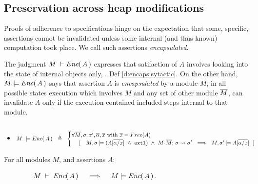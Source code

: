 \subsection{Preservation across heap modifications}

 
Proofs of adherence to {\SpecLang specifications  hinge on the expectation that some,  specific, assertions cannot be invalidated unless some 
} internal (and thus known) computation took place. 
{We call such assertions   \emph{encapsulated}.}
 

The judgment $M\ \vdash {\ensuremath Enc(\, A\, )}$  expresses that satifaction of $A$ involves looking into the state of  
internal objects only,  \cf. Def \ref{d:encaps:sytactic}.
{On the other hand, $M  \models {\ensuremath Enc(\, A\, )}$ says that assertion $A$  is  \emph{encapsulated} by a module $M$, \ie in all possible states %
execution which involves $M$ and any set of other module $\overline{M}$, can invalidate   $A$ only if the execution contained included steps internal to that module}.
 

\begin{definition} $~$ \\
\label{d:encaps}
\begin{itemize}
\item
$ %
    M\ \models \encaps{A}\ \   \triangleq  \ \   
    \begin{cases}
     \forall \Mtwo, \sigma, \sigma',  \overline{\alpha}, \overline{x} \mbox{ with } \overline{x}=Free(A)\\ %
   \ \ \ \  [\ \ \  \satisfiesA{M}{\sigma}{({A[{\overline {\alpha/x}}]} \ \wedge\ \externalexec)}\  \wedge\ { \leadstoBounded {M\madd\Mtwo}  {\sigma}{\sigma'}} %
   \ \ \Longrightarrow\ \ 
   {M},{\sigma'}\models{A[{\overline {\alpha/x}}]} \ \  ]
    \end{cases}
 $%
 \end{itemize}
  \end{definition}
  
 
  \begin{lemma}
\label{lem:encap-soundness}
For all modules $M$, and assertions $A$: 

$\strut \hspace{1.5cm} M\ \vdash\ {Enc(\, A\, )} \ \ \ \ \Longrightarrow\ \ \ \ M \models {\ensuremath Enc(\, A\, )}$.
\end{lemma}

